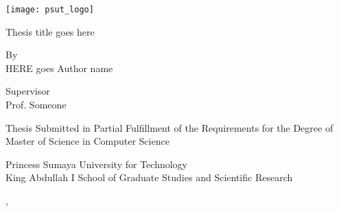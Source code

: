 \begin{titlepage}
\singlespacing
\centering
\bfseries
\vspace{24pt}
{\texttt{[image: psut\_logo]}\par}
\vspace{24pt}
{\fontsize{24pt}{36pt}\selectfont Thesis title goes here \par}
\vspace{24pt}
{\fontsize{16pt}{24pt}\selectfont
By\\
HERE goes Author name\par}
\vspace{36pt}
{\fontsize{16pt}{24pt}\selectfont
Supervisor\\
Prof. Someone\par}
\vspace{24pt}
{\fontsize{14pt}{21pt}\selectfont
Thesis Submitted in Partial Fulfillment of the Requirements for the
Degree of Master of Science in Computer Science\par}
\vspace{24pt}
{\fontsize{16pt}{24pt}\selectfont
Princess Sumaya University for Technology\\
King Abdullah I School of Graduate Studies and Scientific Research\par}
\vspace{24pt}
\vfill
{\fontsize{16pt}{24pt}\selectfont\monthname, \the\year \par}
\onehalfspacing
\end{titlepage}
